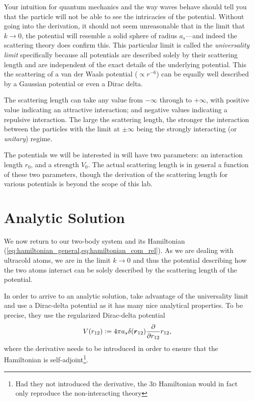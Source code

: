 \documentclass[
  a4paper,             %
  11pt,                %
  oneside,             %
  onecolumn,           %
  bibliography=totoc,  %
  final,               %
]{scrartcl}
\begin{document}
Your intuition for quantum mechanics and the way waves behave should tell you
that the particle will not be able to see the intricacies of the potential.
Without going into the derivation, it should not seem unreasonable that in the
limit that \(k \to 0\), the potential will resemble a solid sphere of radius
\(a_{s}\)---and indeed the scattering theory does confirm this.  This particular
limit is called the \emph{universality limit} specifically because all
potentials are described solely by their scattering length and are independent
of the exact details of the underlying potential.  This the scattering of a van
der Waals potential (\(\propto r^{-6}\)) can be equally well described by a
Gaussian potential or even a Dirac delta.

The scattering length can take any value from \(-\infty\) through to
\(+\infty\), with positive value indicating an attractive interaction; and
negative values indicating a repulsive interaction.  The large the scattering
length, the stronger the interaction between the particles with the limit at
\(\pm \infty\) being the strongly interacting (or \emph{unitary}) regime.

The potentials we will be interested in will have two parameters: an interaction
length \(r_{0}\), and a strength \(V_{0}\).  The actual scattering length is in
general a function of these two parameters, though the derivation of the
scattering length for various potentials is beyond the scope of this lab.

\cleardoublepage
\section{Analytic Solution}
\label{sec:analytic_solution}

We now return to our two-body system and its Hamiltonian
(\cref{eq:hamiltonian_general,eq:hamiltonian_com_rel}).  As we are dealing with
ultracold atoms, we are in the limit \(k \to 0\) and thus the potential
describing how the two atoms interact can be solely described by the scattering
length of the potential.

In order to arrive to an analytic solution, \citeauthor{busch1998}
\cite{busch1998} take advantage of the universality limit and use a Dirac-delta
potential as it has many nice analytical properties.  To be precise, they use
the regularized Dirac-delta potential
\begin{equation}
  V(r_{12}) \vcentcolon= 4 \pi a_{s} \delta(\boldsymbol{r}_{12}) \frac{\partial{}}{\partial{r_{12}}} r_{12},
\end{equation}
where the derivative needs to be introduced in order to ensure that the
Hamiltonian is self-adjoint\footnote{Had they not introduced the derivative, the
  \textsc{3d} Hamiltonian would in fact only reproduce the non-interacting
  theory}.
\end{document}

